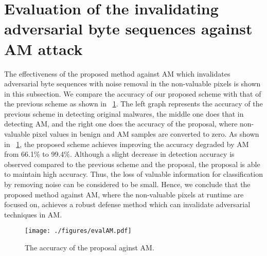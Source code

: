 \section{Evaluation of the invalidating adversarial byte sequences against AM attack}
The effectiveness of the proposed method against AM which invalidates adversarial byte sequences with noise removal in the non-valuable pixels is shown in this subsection.
We compare the accuracy of our proposed scheme with that of the previous scheme as shown in \figurename~\ref{fig:evalAM}.
The left graph represents the accuracy of the previous scheme in detecting original malwares, the middle one does that in detecting AM, and the right one does the accuracy of the proposal, where non-valuable pixel values in benign and AM samples are converted to zero.
As shown in \figurename~\ref{fig:evalAM}, the proposed scheme achieves improving the accuracy degraded by AM from 66.1\% to 99.4\%.
Although a slight decrease in detection accuracy is observed compared to the previous scheme and the proposal, the proposal is able to maintain high accuracy.
Thus, the loss of valuable information for classification by removing noise can be considered to be small.
Hence, we conclude that the proposed method against AM, where the non-valuable pixels at runtime are focused on, achieves a robust defense method which can invalidate adversarial techniques in AM.

\begin{figure}[h]
 \centering
 \texttt{[image: ./figures/evalAM.pdf]}
 \caption{The accuracy of the proposal aginst AM.} 
 \label{fig:evalAM}
\end{figure}
\newpage

